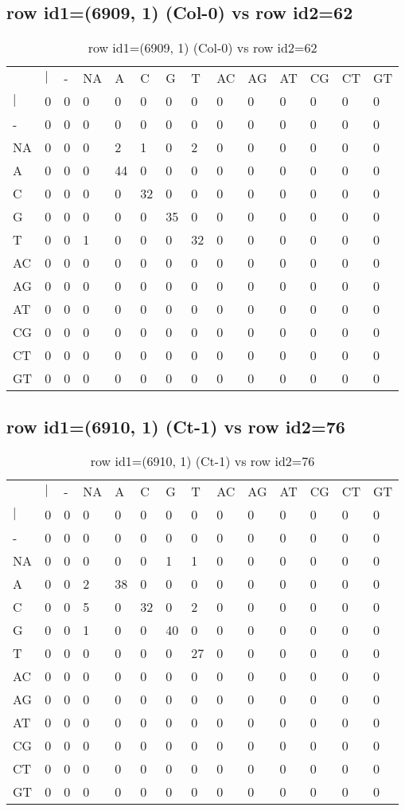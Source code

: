 \subsection{row id1=(6909, 1) (Col-0) vs row id2=62}
\begin{center}
\begin{longtable}{|l|l|l|l|l|l|l|l|l|l|l|l|l|l|}
\caption{row id1=(6909, 1) (Col-0) vs row id2=62} \label{table_dm84}\\
\hline
\\
\hline
&$|$&-&NA&A&C&G&T&AC&AG&AT&CG&CT&GT\\
$|$&0&0&0&0&0&0&0&0&0&0&0&0&0\\
-&0&0&0&0&0&0&0&0&0&0&0&0&0\\
NA&0&0&0&2&1&0&2&0&0&0&0&0&0\\
A&0&0&0&44&0&0&0&0&0&0&0&0&0\\
C&0&0&0&0&32&0&0&0&0&0&0&0&0\\
G&0&0&0&0&0&35&0&0&0&0&0&0&0\\
T&0&0&1&0&0&0&32&0&0&0&0&0&0\\
AC&0&0&0&0&0&0&0&0&0&0&0&0&0\\
AG&0&0&0&0&0&0&0&0&0&0&0&0&0\\
AT&0&0&0&0&0&0&0&0&0&0&0&0&0\\
CG&0&0&0&0&0&0&0&0&0&0&0&0&0\\
CT&0&0&0&0&0&0&0&0&0&0&0&0&0\\
GT&0&0&0&0&0&0&0&0&0&0&0&0&0\\
\hline
\end{longtable}
\end{center}

\subsection{row id1=(6910, 1) (Ct-1) vs row id2=76}
\begin{center}
\begin{longtable}{|l|l|l|l|l|l|l|l|l|l|l|l|l|l|}
\caption{row id1=(6910, 1) (Ct-1) vs row id2=76} \label{table_dm86}\\
\hline
\\
\hline
&$|$&-&NA&A&C&G&T&AC&AG&AT&CG&CT&GT\\
$|$&0&0&0&0&0&0&0&0&0&0&0&0&0\\
-&0&0&0&0&0&0&0&0&0&0&0&0&0\\
NA&0&0&0&0&0&1&1&0&0&0&0&0&0\\
A&0&0&2&38&0&0&0&0&0&0&0&0&0\\
C&0&0&5&0&32&0&2&0&0&0&0&0&0\\
G&0&0&1&0&0&40&0&0&0&0&0&0&0\\
T&0&0&0&0&0&0&27&0&0&0&0&0&0\\
AC&0&0&0&0&0&0&0&0&0&0&0&0&0\\
AG&0&0&0&0&0&0&0&0&0&0&0&0&0\\
AT&0&0&0&0&0&0&0&0&0&0&0&0&0\\
CG&0&0&0&0&0&0&0&0&0&0&0&0&0\\
CT&0&0&0&0&0&0&0&0&0&0&0&0&0\\
GT&0&0&0&0&0&0&0&0&0&0&0&0&0\\
\hline
\end{longtable}
\end{center}

